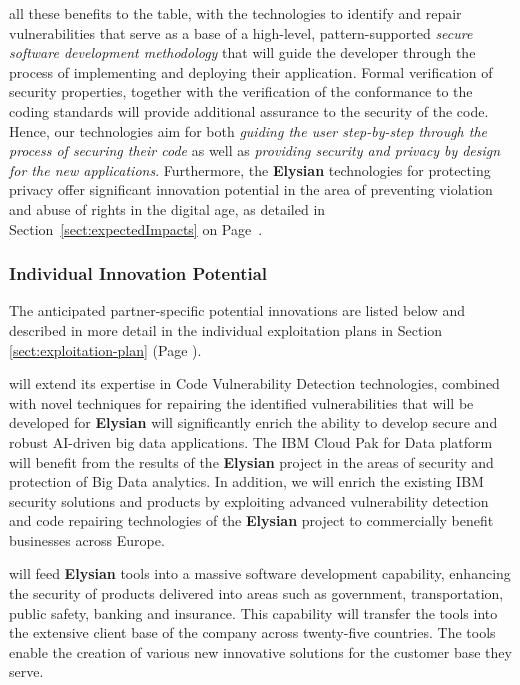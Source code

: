 \documentclass[a4paper,11pt]{article}
\newcommand{\project}[1]{\textbf{#1}\xspace}
\newcommand{\SECURITY}{\project{Elysian}}
\newcommand{\TheProject}{\SECURITY}
\begin{document}
all these benefits to the table, with the technologies to identify and repair vulnerabilities that serve as a base of a high-level, pattern-supported \emph{secure software development methodology} that will guide the developer through the process of implementing and deploying their application. Formal verification of security properties, together with the verification of the conformance to the coding standards will provide additional assurance to the security of the code. Hence, our technologies aim for both \emph{guiding the user step-by-step through the process of securing their code} as well as \emph{providing security and privacy by design for the new applications}.  %
Furthermore, the \TheProject{} technologies for protecting privacy offer significant innovation potential in the area of preventing violation and abuse of rights in the digital age, as detailed in Section~\ref{sect:expectedImpacts} on Page~\pageref{box:gender}.

\subsubsection*{Individual Innovation Potential}

The anticipated partner-specific potential innovations are listed below and described in more detail in the individual exploitation plans in Section \ref{sect:exploitation-plan} (Page \pageref{sect:exploitation-plan}).

\begin{mdframed}[backgroundcolor=blue!5]
\IBMshort{} will extend its expertise in Code Vulnerability Detection technologies, combined with novel techniques for repairing the identified vulnerabilities that will be developed for \TheProject{} will significantly enrich the ability to develop secure and robust AI-driven big data applications. The IBM Cloud Pak for Data platform will benefit from the results of the \TheProject{} project in the areas of security and protection of Big Data analytics. In addition, we will enrich the existing IBM security solutions and products by exploiting advanced vulnerability detection and code repairing technologies of the \TheProject{} project to commercially benefit businesses across Europe.
\end{mdframed}

\begin{mdframed}[backgroundcolor=blue!5]
\SOPRAshort{} will feed \TheProject{} tools into a massive software development capability, enhancing the security of products delivered into areas such as government, transportation, public safety, banking and insurance. This capability will transfer the tools into the extensive client base of the company across twenty-five countries. The tools enable the creation of various new innovative solutions for the customer base they serve.
\end{mdframed}
\end{document}
